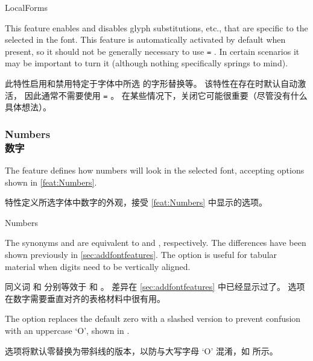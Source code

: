 \documentclass[a4paper]{l3doc}
\begin{document}
\begin{features}{LocalForms}
\end{features}

This feature enables and disables glyph substitutions, etc., that are specific to the
 selected in the font.
This feature is automatically activated by default when present,
so it should not be generally necessary to use  \texttt{=} .
In certain scenarios it may be important to turn it  (although nothing specifically springs to mind).

此特性启用和禁用特定于字体中所选  的字形替换等。
该特性在存在时默认自动激活，
因此通常不需要使用  \texttt{=} 。
在某些情况下，关闭它可能很重要（尽管没有什么具体想法）。


\subsubsection{Numbers\\数字}

The  feature defines how numbers will look in the
selected font, accepting options shown in \ref{feat:Numbers}.

 特性定义所选字体中数字的外观，接受 \ref{feat:Numbers} 中显示的选项。

\begin{features}{Numbers}
\end{features}

The synonyms
 and  are equivalent to  and
, respectively.
The differences have been shown previously
in \vref{sec:addfontfeatures}.
The  option is useful for tabular material when digits need
to be vertically aligned.

同义词  和  分别等效于  和 。
差异在 \vref{sec:addfontfeatures} 中已经显示过了。
 选项在数字需要垂直对齐的表格材料中很有用。

The  option
replaces the default zero with a slashed version to prevent
confusion with an uppercase `O', shown in .

 选项将默认零替换为带斜线的版本，以防与大写字母 `O' 混淆，如  所示。
\end{document}
